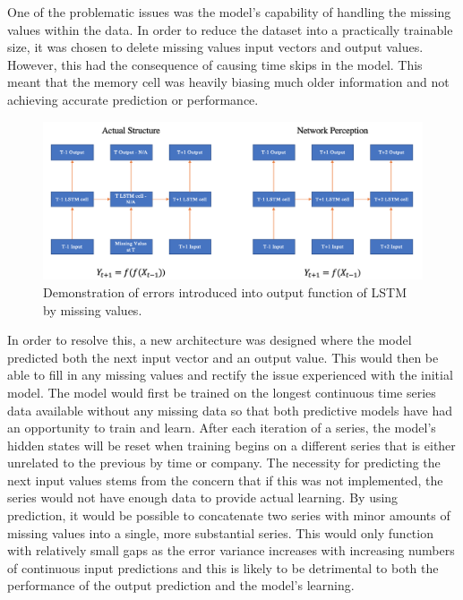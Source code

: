 \documentclass[10pt,onecolumn,letterpaper]{article}
\begin{document}
One of the problematic issues was the model's capability of handling the missing values within the data. In order to reduce the dataset into a practically trainable size, it was chosen to delete missing values input vectors and output values. However, this had the consequence of causing time skips in the model. This meant that the memory cell was heavily biasing much older information and not achieving accurate prediction or performance. 

\begin{figure}[!hbt!]
\centering
\includegraphics[width=16.5cm]{rnn_missingval_perception.png}
\caption{Demonstration of errors introduced into output function of LSTM by missing values.}
\end{figure}

In order to resolve this, a new architecture was designed where the model predicted both the next input vector and an output value. This would then be able to fill in any missing values and rectify the issue experienced with the initial model. The model would first be trained on the longest continuous time series data available without any missing data so that both predictive models have had an opportunity to train and learn. After each iteration of a series, the model's hidden states will be reset when training begins on a different series that is either unrelated to the previous by time or company. The necessity for predicting the next input values stems from the concern that if this was not implemented, the series would not have enough data to provide actual learning. By using prediction, it would be possible to concatenate two series with minor amounts of missing values into a single, more substantial series. This would only function with relatively small gaps as the error variance increases with increasing numbers of continuous input predictions and this is likely to be detrimental to both the performance of the output prediction and the model's learning.
\end{document}

